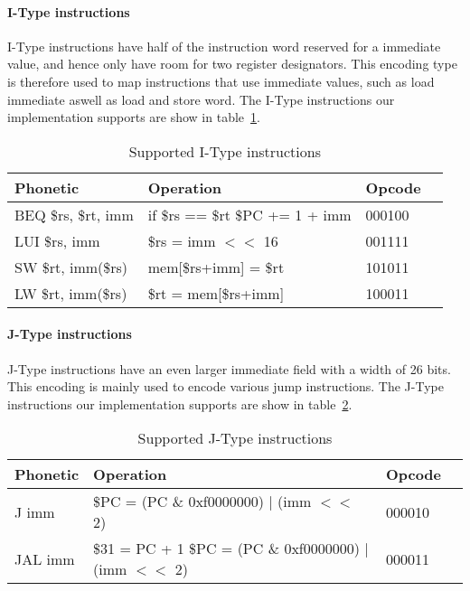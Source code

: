 \paragraph{I-Type instructions}

I-Type instructions have half of the instruction word reserved for a immediate value, and hence only have room for two register designators. This encoding type is therefore used to map instructions that use immediate values, such as load immediate aswell as load and store word. The I-Type instructions our implementation supports are show in table~\ref{table:itype_instructions}.

\begin{table}[h]
    \begin{tabular}{l|l|l|l}

    Phonetic & Operation & Opcode \\
    \hline
    BEQ \$rs, \$rt, imm  & if \$rs == \$rt \$PC += 1 + imm & 000100 \\
    LUI \$rs, imm        & \$rs = imm $<<$ 16                & 001111 \\
    SW \$rt, imm(\$rs)   & mem[\$rs+imm] = \$rt            & 101011 \\
    LW \$rt, imm(\$rs)   & \$rt = mem[\$rs+imm]            & 100011 \\
    \hline
    
    \end{tabular}

    \caption{Supported I-Type instructions}
    \label{table:itype_instructions}
\end{table}

\paragraph{J-Type instructions}

J-Type instructions have an even larger immediate field with a width of 26 bits. This encoding is mainly used to encode various jump instructions. The J-Type instructions our implementation supports are show in table~\ref{table:jtype_instructions}.

\begin{table}[h]
    \begin{tabular}{l|l|l|l}

    Phonetic & Operation & Opcode \\
    \hline
    J imm  & \$PC = (PC \& 0xf0000000) | (imm $<<$ 2) & 000010 \\
    JAL imm  & \$31 = PC + 1 \$PC = (PC \& 0xf0000000) | (imm $<<$ 2) & 000011 \\
    \hline
    
    \end{tabular}

    \caption{Supported J-Type instructions}
    \label{table:jtype_instructions}
\end{table}
